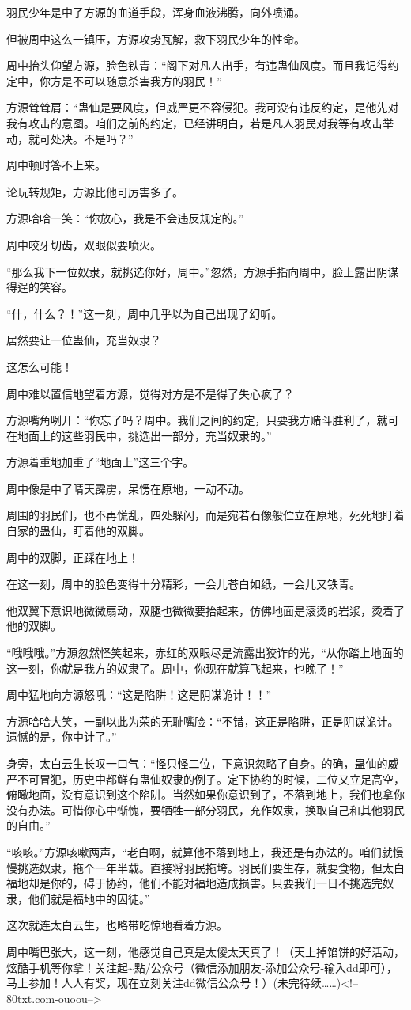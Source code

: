 \begin{this_body}
羽民少年是中了方源的血道手段，浑身血液沸腾，向外喷涌。

但被周中这么一镇压，方源攻势瓦解，救下羽民少年的性命。

周中抬头仰望方源，脸色铁青：“阁下对凡人出手，有违蛊仙风度。而且我记得约定中，你方是不可以随意杀害我方的羽民！”

方源耸耸肩：“蛊仙是要风度，但威严更不容侵犯。我可没有违反约定，是他先对我有攻击的意图。咱们之前的约定，已经讲明白，若是凡人羽民对我等有攻击举动，就可处决。不是吗？”

周中顿时答不上来。

论玩转规矩，方源比他可厉害多了。

方源哈哈一笑：“你放心，我是不会违反规定的。”

周中咬牙切齿，双眼似要喷火。

“那么我下一位奴隶，就挑选你好，周中。”忽然，方源手指向周中，脸上露出阴谋得逞的笑容。

“什，什么？！”这一刻，周中几乎以为自己出现了幻听。

居然要让一位蛊仙，充当奴隶？

这怎么可能！

周中难以置信地望着方源，觉得对方是不是得了失心疯了？

方源嘴角咧开：“你忘了吗？周中。我们之间的约定，只要我方赌斗胜利了，就可在地面上的这些羽民中，挑选出一部分，充当奴隶的。”

方源着重地加重了“地面上”这三个字。

周中像是中了晴天霹雳，呆愣在原地，一动不动。

周围的羽民们，也不再慌乱，四处躲闪，而是宛若石像般伫立在原地，死死地盯着自家的蛊仙，盯着他的双脚。

周中的双脚，正踩在地上！

在这一刻，周中的脸色变得十分精彩，一会儿苍白如纸，一会儿又铁青。

他双翼下意识地微微扇动，双腿也微微要抬起来，仿佛地面是滚烫的岩浆，烫着了他的双脚。

“哦哦哦。”方源忽然怪笑起来，赤红的双眼尽是流露出狡诈的光，“从你踏上地面的这一刻，你就是我方的奴隶了。周中，你现在就算飞起来，也晚了！”

周中猛地向方源怒吼：“这是陷阱！这是阴谋诡计！！”

方源哈哈大笑，一副以此为荣的无耻嘴脸：“不错，这正是陷阱，正是阴谋诡计。遗憾的是，你中计了。”

身旁，太白云生长叹一口气：“怪只怪二位，下意识忽略了自身。的确，蛊仙的威严不可冒犯，历史中都鲜有蛊仙奴隶的例子。定下协约的时候，二位又立足高空，俯瞰地面，没有意识到这个陷阱。当然如果你意识到了，不落到地上，我们也拿你没有办法。可惜你心中惭愧，要牺牲一部分羽民，充作奴隶，换取自己和其他羽民的自由。”

“咳咳。”方源咳嗽两声，“老白啊，就算他不落到地上，我还是有办法的。咱们就慢慢挑选奴隶，拖个一年半载。直接将羽民拖垮。羽民们要生存，就要食物，但太白福地却是你的，碍于协约，他们不能对福地造成损害。只要我们一日不挑选完奴隶，他们就是福地中的囚徒。”

这次就连太白云生，也略带吃惊地看着方源。

周中嘴巴张大，这一刻，他感觉自己真是太傻太天真了！（天上掉馅饼的好活动，炫酷手机等你拿！关注起\~{}點/公众号（微信添加朋友-添加公众号-输入dd即可），马上参加！人人有奖，现在立刻关注dd微信公众号！）(未完待续……)<!--80txt.com-ouoou-->

\end{this_body}

